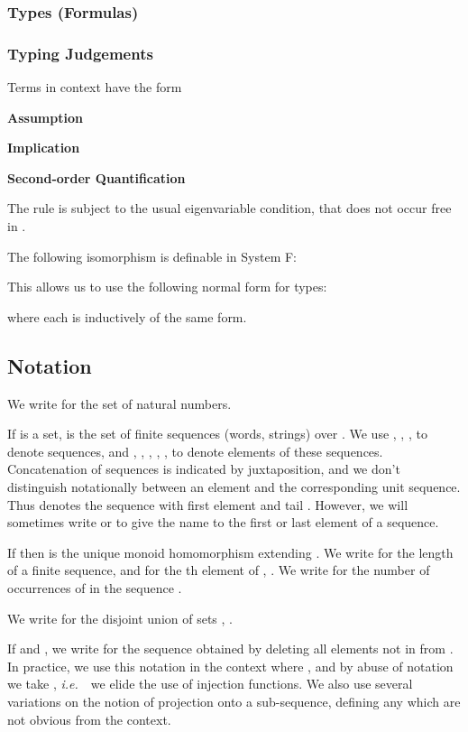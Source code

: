 \documentclass[a4paper,11pt]{article}
\newcommand{\ie}{\textit{i.e.}\ }
\begin{document}
\subsubsection*{Types (Formulas)}



\subsubsection*{Typing Judgements}
Terms in context have the form

\textbf{Assumption}


\noindent \textbf{Implication}


\noindent \textbf{Second-order Quantification}

The  rule is subject to the usual eigenvariable
condition, that  does not occur free in .

\noindent The following isomorphism is definable in System F:

This allows us to use the following normal form for types:

where each  is inductively of the same form.

\subsection{Notation}
We write  for the set of natural numbers.

If  is a set,  is the set of finite sequences (words, strings)
over .  We use , , ,  to denote sequences, and ,
, , , ,  to denote elements of these sequences.
Concatenation of sequences is indicated by juxtaposition, and we don't
distinguish notationally between an element and the corresponding unit
sequence. Thus  denotes the sequence with first element  and
tail
. However, we will sometimes write  or  to
give the name  to the first or last element of a sequence.

If  then  is the
unique
monoid homomorphism extending .  We write  for the length of a
finite sequence, and  for the th element of ,
. We write  for the number of occurrences of  in the sequence .

We write  for the disjoint union of sets , .

If  and , we write  for the
sequence obtained by deleting all elements not in  from . In
practice, we use this notation in the context where , and
by abuse of notation we take , {\ie}\ we
elide the use of injection functions.
We also use several variations on the notion of projection onto a sub-sequence, defining any which are not obvious from the context.
\end{document}
